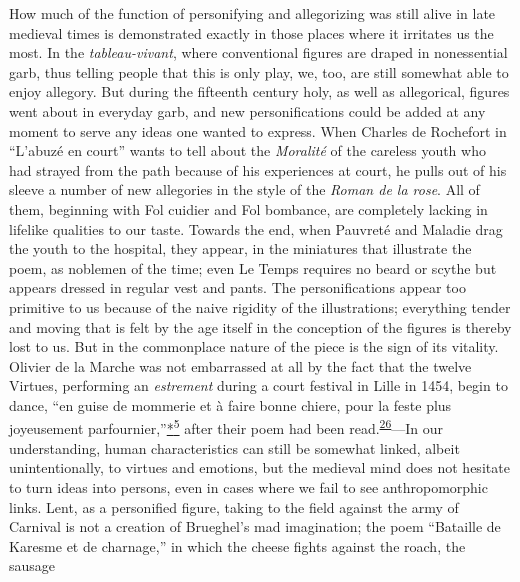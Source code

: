 How much of the function of personifying and allegorizing was still
alive in late medieval times is demonstrated exactly in those places
where it irritates us the most. In the \emph{tableau-vivant}, where
conventional figures are draped in nonessential garb, thus telling
people that this is only play, we, too, are still somewhat able to enjoy
allegory. But during the fifteenth century holy, as well as allegorical,
figures went about in everyday garb, and new personifications could be
added at any moment to serve any ideas one wanted to express. When
Charles de Rochefort in ``L'abuzé en court'' wants to tell about the
\emph{Moralité} of the careless youth who had strayed from the path
because of his experiences at court, he pulls out of his sleeve a number
of new allegories in the style of the \emph{Roman de la rose}. All of
them, beginning with Fol cuidier and Fol bombance, are completely
lacking in lifelike qualities to our taste. Towards the end, when
Pauvreté and Maladie drag the youth to the hospital, they appear, in the
miniatures that illustrate the poem, as noblemen of the time; even Le
Temps requires no beard or scythe but appears dressed in regular vest
and pants. The personifications appear too primitive to us because of
the naive rigidity
\protect\hypertarget{16_Chapter_Nine__THE_DECLINE_OF_SYM.xhtmlux5cux23page_246}{}{}of
the illustrations; everything tender and moving that is felt by the age
itself in the conception of the figures is thereby lost to us. But in
the commonplace nature of the piece is the sign of its vitality. Olivier
de la Marche was not embarrassed at all by the fact that the twelve
Virtues, performing an \emph{estrement} during a court festival in Lille
in 1454, begin to dance, ``en guise de mommerie et à faire bonne chiere,
pour la feste plus joyeusement
parfournier,''\protect\hypertarget{16_Chapter_Nine__THE_DECLINE_OF_SYM.xhtmlux5cux23id_2581}{\protect\hyperlink{23_NOTES.xhtmlux5cux23id_2582}{*\textsuperscript{5}}}
after their poem had been
read.\textsuperscript{\protect\hypertarget{16_Chapter_Nine__THE_DECLINE_OF_SYM.xhtmlux5cux23id_742}{\protect\hyperlink{23_NOTES.xhtmlux5cux23id_743}{26}}}---In
our understanding, human characteristics can still be somewhat linked,
albeit unintentionally, to virtues and emotions, but the medieval mind
does not hesitate to turn ideas into persons, even in cases where we
fail to see anthropomorphic links. Lent, as a personified figure, taking
to the field against the army of Carnival is not a creation of
Brueghel's mad imagination; the poem ``Bataille de Karesme et de
charnage,'' in which the cheese fights against the roach, the sausage
